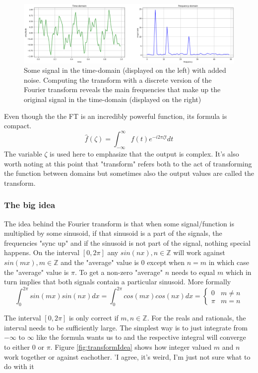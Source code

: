 \begin{figure}[ht]
    \centering
    \includegraphics[width=\textwidth]{./images/transform.png}
    \caption{Some signal in the time-domain (displayed on the left) with added noise. Computing the transform with a discrete version of the Fourier transform reveals the main frequencies that make up the original signal in the time-domain (displayed on the right)\label{fig:transform}}
\end{figure}

Even though the the FT is an incredibly powerful function, its formula is compact. 
$$\hat{f}(\zeta) = \int_{-\infty}^{\infty} f(t)e^{-i2\pi\zeta t} dt$$
The variable $\zeta$ is used here to emphasize that the output is complex. It's also worth noting at this point that "transform" refers both to the act of transforming the function between domains but sometimes also the output values are called the transform.

\subsubsection{The big idea}
The idea behind the Fourier transform is that when some signal/function is multiplied by some sinusoid, if that sinusoid is a part of the signals, the frequencies "sync up" and if the sinusoid is not part of the signal, nothing special happens. On the interval $[0, 2\pi]$ any $sin(nx), n\in\mathbb{Z}$ will work against $sin(mx), m\in\mathbb{Z}$ and the "average" value is 0 except when $n=m$ in which case the "average" value is $\pi$. To get a non-zero "average" $n$ needs to equal $m$ which in turn implies that both signals contain a particular sinusoid. More formally 
\[ \int_0^{2\pi} sin(mx)sin(nx)dx = \int_0^{2\pi} cos(mx)cos(nx)dx= 
\begin{cases} %
      0 & m\neq n \\
      \pi & m=n
   \end{cases} 
\]

The interval $[0, 2\pi]$ is only correct if $m, n \in \mathbb{Z}$. For the reals and rationals, the interval needs to be sufficiently large. The simplest way is to just integrate from $-\infty$ to $\infty$ like the formula wants us to and the respective integral will converge to either $0$ or $\pi$. Figure \ref{fig:transformIdea} shows how integer valued $m$ and $n$ work together or against eachother. \todo'{I agree, it's weird, I'm just not sure what to do with it}

